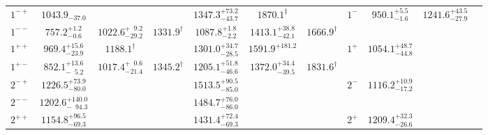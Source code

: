 \begin{table}[!th]
\begin{tabular}{c|ccc|ccc||c|ccc}
\hline                                                                                                                                                                                                     
$1^{-+}$                    & $1043.9_{-37.0}$                     &                                    &                &  $1347.3^{+73.2}_{-43.7}$ &  $1870.1^{\ddag}$         &                   &  \multirow{2}{*}{$1^-$}       &   \multirow{2}{*}{$ 950.1^{+5.5}_{-1.6}$} &  \multirow{2}{*}{$1241.6^{+43.5}_{-27.9}$ } & \multirow{2}{*}{  } \\
$1^{--}$                    & $757.2^{+1.2}_{-0.6}$                & $1022.6^{+\phantom{1}9.2}_{-29.2}$ & $1331.9^\dag$  &  $1087.8^{+1.8}_{-2.2}$   &  $1413.1^{+38.8}_{-42.1}$ &   $1666.9^\dag$   &         &     & & \\                                                                                                                                                                       
$1^{++}$                    & $969.4^{+15.6}_{-23.9}$              & $1188.1^\dag$                      &                &  $1301.0^{+34.7}_{-28.5}$ &  $1591.9^{+181.2}$        &                   &  \multirow{2}{*}{$1^+$}       & \multirow{2}{*}{$1054.1^{+48.7}_{-44.8}$} &  \multirow{2}{*}{} & \multirow{2}{*}{} \\
$1^{+-}$                    & $852.1^{+13.6}_{-\phantom{1}5.2}$    & $1017.4^{+\phantom{1}0.6}_{-21.4}$ & $1345.2^\dag$  &  $1205.1^{+51.8}_{-46.6}$ &  $1372.0^{+34.4}_{-39.5}$ &   $1831.6^\dag$   &         &     & & \\
\hline                                                                                                                                                                                                     
$2^{-+}$                    & $1226.5^{+73.9}_{-80.0}$             &                                    &                &  $1513.5^{+90.5}_{-85.0}$ &                           &                   &  \multirow{2}{*}{$2^-$}       &  \multirow{2}{*}{ $1116.2^{+10.9}_{-17.2}$ } &  \multirow{2}{*}{} & \multirow{2}{*}{} \\
$2^{--}$                    & $1202.6^{+140.0}_{-\phantom{1}94.3}$ &                                    &                &  $1484.7^{+76.0}_{-86.0}$ &                           &                   &         &     & & \\
$2^{++}$                    & $1154.8^{+96.5}_{-69.3}$             &                                    &                &  $1431.4^{+72.4}_{-69.3}$ &                           &                   &  \multirow{2}{*}{$2^+$}       &  \multirow{2}{*}{$1209.4^{+32.3}_{-26.6}$} &  \multirow{2}{*}{} & \multirow{2}{*}{} \\

\end{tabular}
\end{table}
